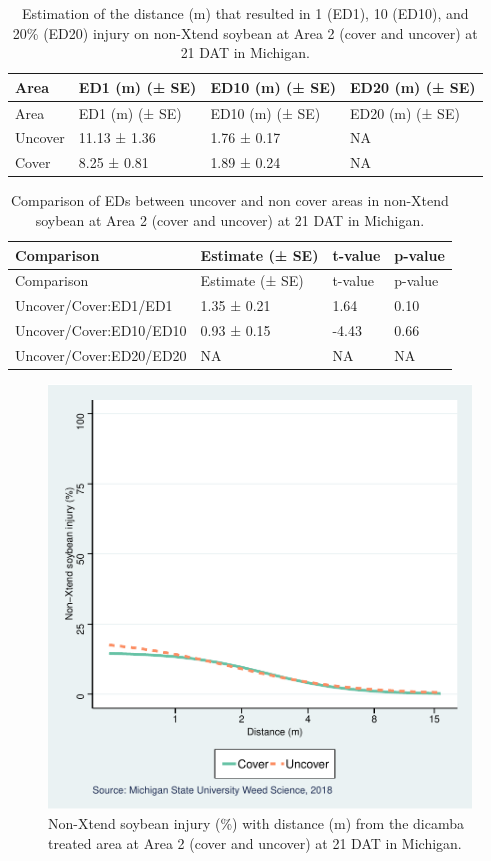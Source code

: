 \documentclass[]{article}
\begin{document}
\begin{longtable}[]{@{}llll@{}}
\caption{Estimation of the distance (m) that resulted in 1 (ED1), 10
(ED10), and 20\% (ED20) injury on non-Xtend soybean at Area 2 (cover and
uncover) at 21 DAT in Michigan.}\tabularnewline
\toprule
Area & ED1 (m) (± SE) & ED10 (m) (± SE) & ED20 (m) (± SE)\tabularnewline
\midrule
\endfirsthead
\toprule
Area & ED1 (m) (± SE) & ED10 (m) (± SE) & ED20 (m) (± SE)\tabularnewline
\midrule
\endhead
Uncover & 11.13 ± 1.36 & 1.76 ± 0.17 & NA\tabularnewline
Cover & 8.25 ± 0.81 & 1.89 ± 0.24 & NA\tabularnewline
\bottomrule
\end{longtable}

\begin{longtable}[]{@{}llll@{}}
\caption{Comparison of EDs between uncover and non cover areas in
non-Xtend soybean at Area 2 (cover and uncover) at 21 DAT in
Michigan.}\tabularnewline
\toprule
Comparison & Estimate (± SE) & t-value & p-value\tabularnewline
\midrule
\endfirsthead
\toprule
Comparison & Estimate (± SE) & t-value & p-value\tabularnewline
\midrule
\endhead
Uncover/Cover:ED1/ED1 & 1.35 ± 0.21 & 1.64 & 0.10\tabularnewline
Uncover/Cover:ED10/ED10 & 0.93 ± 0.15 & -4.43 & 0.66\tabularnewline
Uncover/Cover:ED20/ED20 & NA & NA & NA\tabularnewline
\bottomrule
\end{longtable}

\begin{figure}
\centering
\includegraphics{Report_files/figure-latex/unnamed-chunk-53-1.pdf}
\caption{Non-Xtend soybean injury (\%) with distance (m) from the
dicamba treated area at Area 2 (cover and uncover) at 21 DAT in
Michigan.}
\end{figure}
\end{document}
